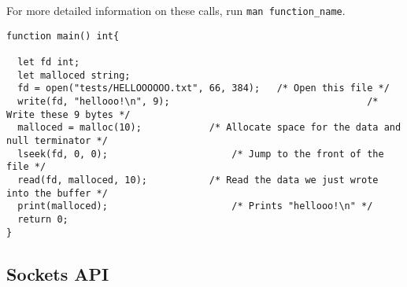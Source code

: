 		\noindent
		For more detailed information on these calls, run \texttt{man function\_name}.

		\begin{lstlisting}
function main() int{

  let fd int;
  let malloced string;
  fd = open("tests/HELLOOOOOO.txt", 66, 384); 	/* Open this file */
  write(fd, "hellooo!\n", 9); 									/* Write these 9 bytes */
  malloced = malloc(10); 			/* Allocate space for the data and null terminator */
  lseek(fd, 0, 0);						/* Jump to the front of the file */
  read(fd, malloced, 10);			/* Read the data we just wrote into the buffer */
  print(malloced);						/* Prints "hellooo!\n" */
  return 0;
}
		\end{lstlisting}

	\subsection{Sockets API}